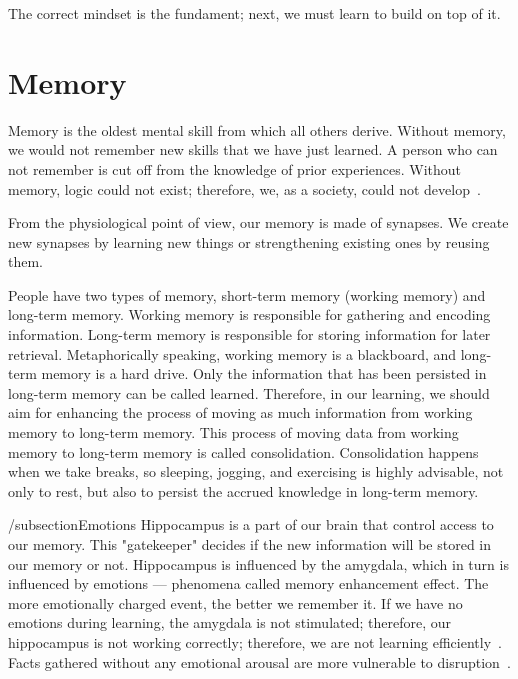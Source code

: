 \documentclass{article}
\begin{document}
The correct mindset is the fundament; next, we must learn to build on top of it.

\section{Memory}
Memory is the oldest mental skill from which all others derive. Without memory, we would not remember new skills that we have just learned. A person who can not remember is cut off from the knowledge of prior experiences. Without memory, logic could not exist; therefore, we, as a society, could not develop~\cite{csikszentmihalyi1990flow}.

From the physiological point of view, our memory is made of synapses. We create new synapses by learning new things or strengthening existing ones by reusing them.

People have two types of memory, short-term memory (working memory) and long-term memory. Working memory is responsible for gathering and encoding information. Long-term memory is responsible for storing information for later retrieval. Metaphorically speaking, working memory is a blackboard, and long-term memory is a hard drive. Only the information that has been persisted in long-term memory can be called learned. Therefore, in our learning, we should aim for enhancing the process of moving as much information from working memory to long-term memory. This process of moving data from working memory to long-term memory is called consolidation. Consolidation happens when we take breaks, so sleeping, jogging, and exercising is highly advisable, not only to rest, but also to persist the accrued knowledge in long-term memory.


/subsection{Emotions}
Hippocampus is a part of our brain that control access to our memory. This "gatekeeper" decides if the new information will be stored in our memory or not. Hippocampus is influenced by the amygdala, which in turn is influenced by emotions — phenomena called memory enhancement effect. The more emotionally charged event, the better we remember it. If we have no emotions during learning, the amygdala is not stimulated; therefore, our hippocampus is not working correctly; therefore, we are not learning efficiently~\cite{phelps2004human, tyng2017influences}. Facts gathered without any emotional arousal are more vulnerable to disruption~\cite{doi:10.1111/1467-9280.00090}.
\end{document}
